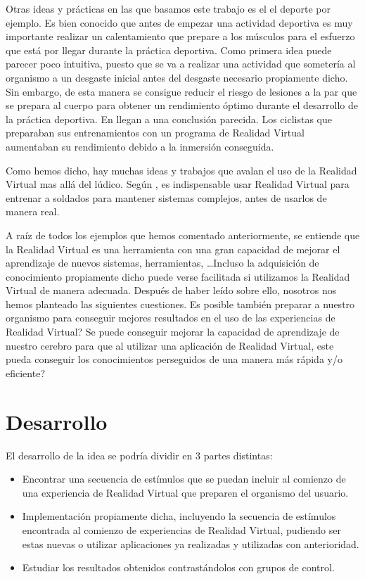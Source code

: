\documentclass[twoside,twocolumn]{article}
\begin{document}
Otras ideas y pr\'acticas en las que basamos este trabajo es el el deporte por ejemplo. Es bien conocido que antes de empezar una actividad deportiva es muy importante realizar un calentamiento que prepare a los m\'usculos para el esfuerzo que est\'a por llegar durante la pr\'actica deportiva. Como primera idea puede parecer poco intuitiva, puesto que se va a realizar una actividad que someter\'ia al organismo a un desgaste inicial antes del desgaste necesario propiamente dicho. Sin embargo, de esta manera se consigue reducir el riesgo de lesiones a la par que se prepara al cuerpo para obtener un rendimiento \'optimo durante el desarrollo de la pr\'actica deportiva. En \cite{Preparation} llegan a una conclusi\'on parecida. Los ciclistas que preparaban sus entrenamientos con un programa de Realidad Virtual aumentaban su rendimiento debido a la inmersi\'on conseguida.

Como hemos dicho, hay muchas ideas y trabajos que avalan el uso de la Realidad Virtual mas all\'a del l\'udico. Seg\'un \cite{Army}, es indispensable usar Realidad Virtual para entrenar a soldados para mantener sistemas complejos, antes de usarlos de manera real.

A raíz de todos los ejemplos que hemos comentado anteriormente, se entiende que la Realidad Virtual es una herramienta con una gran capacidad de mejorar el aprendizaje de nuevos sistemas, herramientas, \ldots Incluso la adquisici\'on de conocimiento propiamente dicho puede verse facilitada si utilizamos la Realidad Virtual de manera adecuada. Despu\'es de haber le\'ido sobre ello, nosotros nos hemos planteado las siguientes cuestiones. Es posible tambi\'en preparar a nuestro organismo para conseguir mejores resultados en el uso de las experiencias de Realidad Virtual? Se puede conseguir mejorar la capacidad de aprendizaje de nuestro cerebro para que al utilizar una aplicaci\'on de Realidad Virtual, este pueda conseguir los conocimientos perseguidos de una manera m\'as r\'apida y/o eficiente?


\section{Desarrollo}
El desarrollo de la idea se podr\'ia dividir en 3 partes distintas:

\begin{itemize}
\item Encontrar una secuencia de est\'imulos que se puedan incluir al comienzo de una experiencia de Realidad Virtual que preparen el organismo del usuario.
\item Implementaci\'on propiamente dicha, incluyendo la secuencia de est\'i­mulos encontrada al comienzo de experiencias de Realidad Virtual, pudiendo ser estas nuevas o utilizar aplicaciones ya realizadas y utilizadas con anterioridad.
\item Estudiar los resultados obtenidos contrast\'andolos con grupos de control.
\end{itemize}
\end{document}
